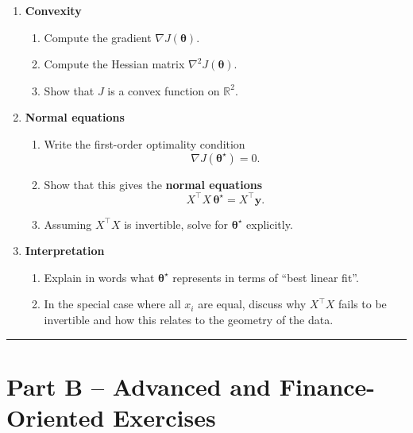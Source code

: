 \documentclass[11pt]{article}
\begin{document}
\begin{enumerate}
\begin{enumerate}
\begin{enumerate}
\item Show that the vector of predictions can be written as $X\bm{\theta}$.
\item Write the least squares objective function
\[
J(\bm{\theta})=\frac12\|X\bm{\theta}-\bm{y}\|^2.
\]
\end{enumerate}

\item \textbf{Convexity}

\begin{enumerate}
\item Compute the gradient $\nabla J(\bm{\theta})$.
\item Compute the Hessian matrix $\nabla^2 J(\bm{\theta})$.
\item Show that $J$ is a convex function on $\mathbb{R}^2$.
\end{enumerate}

\item \textbf{Normal equations}

\begin{enumerate}
\item Write the first-order optimality condition
\[
\nabla J(\bm{\theta}^\star)=0.
\]
\item Show that this gives the \textbf{normal equations}
\[
X^\top X\,\bm{\theta}^\star = X^\top \bm{y}.
\]
\item Assuming $X^\top X$ is invertible, solve for $\bm{\theta}^\star$ explicitly.
\end{enumerate}

\item \textbf{Interpretation}

\begin{enumerate}
\item Explain in words what $\bm{\theta}^\star$ represents in terms of “best linear fit”.
\item In the special case where all $x_i$ are equal, discuss why $X^\top X$ fails to be invertible and how this relates to the geometry of the data.
\end{enumerate}

\end{enumerate}
\end{enumerate}
\bigskip
\hrule
\bigskip

\section*{Part B -- Advanced and Finance-Oriented Exercises}
\end{document}
